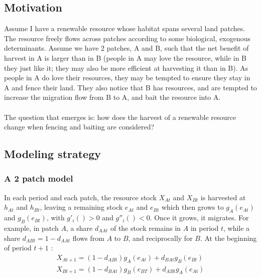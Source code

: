 \documentclass{article}
\begin{document}
\subsection{Motivation}
Assume I have a renewable resource whose habitat spans several land patches. The resource freely flows across patches according to some biological, exogenous determinants.  Assume we have 2 patches, A and B, such that the net benefit of harvest in A is larger than in B (people in A may love the resource, while in B they just like it; they may also be more efficient at harvesting it than in B). As people in A do love their resources, they may be tempted to ensure they stay in A and fence their land. They also notice that B has resources, and are tempted to increase the migration flow from B to A, and bait the resource into A. \\\\
The question that emerges is: how does the harvest of a renewable resource change when fencing and baiting are considered?

\subsection{Modeling strategy}
\subsubsection{A 2 patch model}
In each period and each patch, the resource stock $X_{At}$ and $ X_{Bt}$ is harvested at $h_{At}$ and $h_{Bt}$, leaving a remaining stock $e_{At}$ and $ e_{Bt}$ which then grows to $g_A(e_{At})$ and $g_B(e_{Bt})$, with $g'_i()>0$ and $g''_i()<0$. Once it grows, it migrates. For example, in patch $A$, a share $d_{AAt}$ of the stock remains in $A$ in period $t$, while a share $d_{ABt} = 1-d_{AAt}$ flows from $A$ to $B$, and reciprocally for $B$. At the beginning of period $t+1$ : 
\begin{align}
    X_{At+1} = (1-d_{ABt})g_A(e_{At})+d_{BAt}g_B(e_{Bt})
    \\
    X_{Bt+1} = (1 - d_{BAt})g_B(e_{BT}) + d_{ABt}g_A(e_{At})
\end{align}
\end{document}
